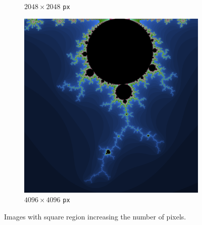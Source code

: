 \documentclass{article}
\begin{document}
\begin{figure}[h!]
\begin{subfigure}[t]{0.3\linewidth}
    \caption{$2048\times 2048$ \texttt{px}}
  \end{subfigure}
  \begin{subfigure}[t]{0.3\linewidth}
    \includegraphics[width=1.0\textwidth]{mb_4096.png}
    \caption{$4096\times 4096$ \texttt{px}}
  \end{subfigure}
  \caption{Images with square region increasing the number of pixels.}
  \label{fig:pixel}
\end{figure}
\end{document}
